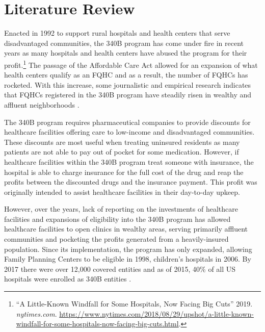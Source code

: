 \documentclass[12pt, ]{article}
\begin{document}
\hypertarget{literature-review}{%
\section{Literature Review}\label{literature-review}}

Enacted in 1992 to support rural hospitals and health centers that serve
disadvantaged communities, the 340B program has come under fire in
recent years as many hospitals and health centers have abused the
program for their profit.\footnote{``A Little-Known Windfall for Some
  Hospitals, Now Facing Big Cuts'' 2019. \emph{nytimes.com}.
  \url{https://www.nytimes.com/2018/08/29/upshot/a-little-known-windfall-for-some-hospitals-now-facing-big-cuts.html}.}
The passage of the Affordable Care Act allowed for an expansion of what
health centers qualify as an FQHC and as a result, the number of FQHCs
has rocketed. With this increase, some journalistic and empirical
research indicates that FQHCs registered in the 340B program have
steadily risen in wealthy and affluent neighborhoods \citep{conti2014}.

The 340B program requires pharmaceutical companies to provide discounts
for healthcare facilities offering care to low-income and disadvantaged
communities. These discounts are most useful when treating uninsured
residents as many patients are not able to pay out of pocket for some
medication. However, if healthcare facilities within the 340B program
treat someone with insurance, the hospital is able to charge insurance
for the full cost of the drug and reap the profits between the
discounted drugs and the insurance payment. This profit was originally
intended to assist healthcare facilities in their day-to-day upkeep.

However, over the years, lack of reporting on the investments of
healthcare facilities and expansions of eligibility into the 340B
program has allowed healthcare facilities to open clinics in wealthy
areas, serving primarily affluent communities and pocketing the profits
generated from a heavily-insured population. Since its implementation,
the program has only expanded, allowing Family Planning Centers to be
eligible in 1998, children's hospitals in 2006. By 2017 there were over
12,000 covered entities and as of 2015, 40\% of all US hospitals were
enrolled as 340B entities \citep{mulcahy2014}.
\end{document}
